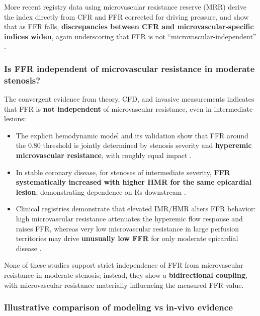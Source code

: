 More recent registry data using microvascular resistance reserve (MRR) derive the index directly from CFR and FFR corrected for driving pressure, and show that as FFR falls, \textbf{discrepancies between CFR and microvascular‑specific indices widen}, again underscoring that FFR is not “microvascular‑independent”  \cite{De Bruyne2021Microvascular} \cite{Boerhout2023Microvascular} \cite{De Vos2023Microvascular}.


\subsubsection*{Is FFR independent of microvascular resistance in moderate stenosis?}


The convergent evidence from theory, CFD, and invasive measurements indicates that FFR is \textbf{not independent} of microvascular resistance, even in intermediate lesions:


\begin{itemize}
\item The explicit hemodynamic model and its validation show that FFR around the 0.80 threshold is jointly determined by stenosis severity and \textbf{hyperemic microvascular resistance}, with roughly equal impact  \cite{Garcia2019Relationship}.
\item In stable coronary disease, for stenoses of intermediate severity, \textbf{FFR systematically increased with higher HMR for the same epicardial lesion}, demonstrating dependence on Rs downstream  \cite{Van De Hoef2014Impact}.
\item Clinical registries demonstrate that elevated IMR/HMR alters FFR behavior: high microvascular resistance attenuates the hyperemic flow response and raises FFR, whereas very low microvascular resistance in large perfusion territories may drive \textbf{unusually low FFR} for only moderate epicardial disease  \cite{Tu2019Fractional} \cite{Galante2025Fractional} \cite{Van De Hoef2014Impact}.
\end{itemize}


None of these studies support strict independence of FFR from microvascular resistance in moderate stenosis; instead, they show a \textbf{bidirectional coupling}, with microvascular resistance materially influencing the measured FFR value.


\subsubsection*{Illustrative comparison of modeling vs in‑vivo evidence}


